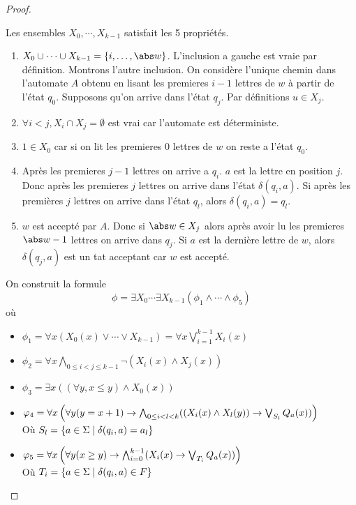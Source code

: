 \begin{proof}
\begin{itemize}
		      Les ensembles $X_0, \cdots, X_{k-1}$ satisfait les 5 propriétés.
		      \begin{enumerate}
			      \item $X_0 \cup \cdots \cup X_{k-1} = \enum i {\abs w}$. L'inclusion a gauche est vraie par définition. Montrons l'autre inclusion.
			            On considère l'unique chemin dans l'automate $A$ obtenu en lisant les premieres $i-1$ lettres de $w$ à partir de l'état $q_0$.
			            Supposons qu'on arrive dans l'état $q_j$. Par définitions $u \in X_j$.
			      \item $\forall i < j, X_i \cap X_j = \emptyset$ est vrai car l'automate est déterministe.
			      \item $1 \in X_0$ car si on lit les premieres $0$ lettres de $w$ on reste a l'état $q_0$.
			      \item Après les premieres $j-1$ lettres on arrive a $q_i$. $a$ est la lettre en position $j$. Donc après les
			            premieres $j$ lettres on arrive dans l'état $\delta (q_i, a)$. Si après les premières $j$ lettres on arrive dans l'état $q_l$, alors
			            $\delta (q_i, a) = q_l$.
			      \item $w$ est accepté par $A$. Donc si $\abs w \in X_j$ alors après avoir lu les premieres $\abs w - 1$ lettres on arrive dans $q_j$.
			            Si $a$ est la dernière lettre de $w$, alors $\delta (q_j,a)$ est un tat acceptant car $w$ est accepté.
		      \end{enumerate}
		      On construit la formule
		      $$ \phi = \exists X_0 \cdots \exists X_{k-1} (\phi_1 \land \cdots \land \phi_5)$$
		      où
		      \begin{itemize}
			      \item $\phi_1 = \forall x (X_0(x) \lor \cdots \lor X_{k-1}) = \forall x \bigvee_{i=1}^{k-1} X_i(x)$
			      \item $\phi_2 = \forall x \bigwedge_{0\leq i < j \leq k-1}\lnot (X_i(x) \land X_j(x))$
			      \item $\phi_3 = \exists x \left((\forall y, x \leq y) \land X_0(x) \right)$
			      \item $\varphi_4 = \forall x \left( \forall y (y = x + 1)  \rightarrow \bigwedge_{0\leq i < l < k} ( (X_i (x) \land X_l(y) )\rightarrow \bigvee_{S_l} Q_a(x))\right)$\\
			            Où $S_l = \left\{a \in \Sigma \mid \delta (q_i,a) = a_l\right\}$
			      \item $\varphi_5 = \forall x \left( \forall y (x \geq y)  \rightarrow \bigwedge_{i = 0}^{k-1} ( X_i(x) \rightarrow \bigvee_{T_i} Q_a(x))\right)$\\
			            Où $T_i = \left\{a \in \Sigma \mid \delta (q_i,a) \in F\right\}$


\end{itemize}
\end{itemize}
\end{proof}

